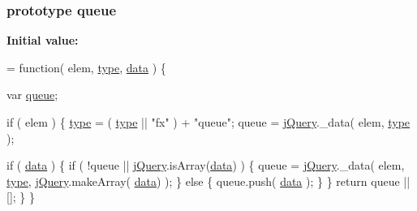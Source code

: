 \subsubsection[{queue}]{ {\bf prototype} queue}\label{jquery-1_810_82-vsdoc_8js_a4a4ce67ab280eb2cff0622a3bdc1f5b3}
{\bfseries Initial value\+:}
\begin{DoxyCode}
= \textcolor{keyword}{function}( elem, \hyperlink{jquery-1_810_82-vsdoc_8js_a3940565e83a9bfd10d95ffd27536da91}{type}, \hyperlink{jquery-1_810_82-vsdoc_8js_a609407b3456fdc3c5671a9fc4a226ff7}{data} ) \{


        var \hyperlink{jquery-1_810_82-vsdoc_8js_a4a4ce67ab280eb2cff0622a3bdc1f5b3}{queue};

        \textcolor{keywordflow}{if} ( elem ) \{
            \hyperlink{jquery-1_810_82-vsdoc_8js_a3940565e83a9bfd10d95ffd27536da91}{type} = ( \hyperlink{jquery-1_810_82-vsdoc_8js_a3940565e83a9bfd10d95ffd27536da91}{type} || \textcolor{stringliteral}{"fx"} ) + \textcolor{stringliteral}{"queue"};
            queue = \hyperlink{jquery-1_810_82-vsdoc_8js_add5237586d970a38a81f990e8eb28c6c}{jQuery}.\_data( elem, \hyperlink{jquery-1_810_82-vsdoc_8js_a3940565e83a9bfd10d95ffd27536da91}{type} );

            
            \textcolor{keywordflow}{if} ( \hyperlink{jquery-1_810_82-vsdoc_8js_a609407b3456fdc3c5671a9fc4a226ff7}{data} ) \{
                \textcolor{keywordflow}{if} ( !queue || \hyperlink{jquery-1_810_82-vsdoc_8js_add5237586d970a38a81f990e8eb28c6c}{jQuery}.isArray(\hyperlink{jquery-1_810_82-vsdoc_8js_a609407b3456fdc3c5671a9fc4a226ff7}{data}) ) \{
                    queue = \hyperlink{jquery-1_810_82-vsdoc_8js_add5237586d970a38a81f990e8eb28c6c}{jQuery}.\_data( elem, \hyperlink{jquery-1_810_82-vsdoc_8js_a3940565e83a9bfd10d95ffd27536da91}{type}, \hyperlink{jquery-1_810_82-vsdoc_8js_add5237586d970a38a81f990e8eb28c6c}{jQuery}.makeArray(
      \hyperlink{jquery-1_810_82-vsdoc_8js_a609407b3456fdc3c5671a9fc4a226ff7}{data}) );
                \} \textcolor{keywordflow}{else} \{
                    queue.push( \hyperlink{jquery-1_810_82-vsdoc_8js_a609407b3456fdc3c5671a9fc4a226ff7}{data} );
                \}
            \}
            \textcolor{keywordflow}{return} queue || [];
        \}
    \}
\end{DoxyCode}
\hypertarget{jquery-1_810_82-vsdoc_8js_afcf7497803a32ea161cd2c7c5345c0ec}{}
